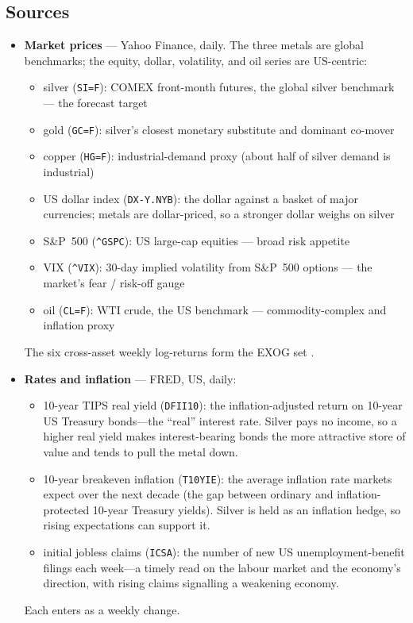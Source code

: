 \documentclass[12pt, a4paper]{article}
\begin{document}
\subsection{Sources}

\begin{itemize}
    \item \textbf{Market prices} --- Yahoo Finance, daily. The three metals are global
    benchmarks; the equity, dollar, volatility, and oil series are US-centric:
    \begin{itemize}[nosep]
        \item silver (\texttt{SI=F}): COMEX front-month futures, the global silver benchmark --- the forecast target
        \item gold (\texttt{GC=F}): silver's closest monetary substitute and dominant co-mover
        \item copper (\texttt{HG=F}): industrial-demand proxy (about half of silver demand is industrial)
        \item US dollar index (\texttt{DX-Y.NYB}): the dollar against a basket of major currencies; metals are dollar-priced, so a stronger dollar weighs on silver
        \item S\&P~500 (\texttt{\textasciicircum GSPC}): US large-cap equities --- broad risk appetite
        \item VIX (\texttt{\textasciicircum VIX}): 30-day implied volatility from S\&P~500 options --- the market's fear / risk-off gauge
        \item oil (\texttt{CL=F}): WTI crude, the US benchmark --- commodity-complex and inflation proxy
    \end{itemize}
    The six cross-asset weekly log-returns form the EXOG set \parencite{batten2010,zhang2010}.

    \item \textbf{Rates and inflation} --- FRED, US, daily:
    \begin{itemize}[nosep]
        \item 10-year TIPS real yield (\texttt{DFII10}): the inflation-adjusted return on
        10-year US Treasury bonds---the ``real'' interest rate. Silver pays no income, so a
        higher real yield makes interest-bearing bonds the more attractive store of value
        and tends to pull the metal down.
        \item 10-year breakeven inflation (\texttt{T10YIE}): the average inflation rate
        markets expect over the next decade (the gap between ordinary and
        inflation-protected 10-year Treasury yields). Silver is held as an inflation hedge,
        so rising expectations can support it.
        \item initial jobless claims (\texttt{ICSA}): the number of new US
        unemployment-benefit filings each week---a timely read on the labour market and the
        economy's direction, with rising claims signalling a weakening economy.
    \end{itemize}
    Each enters as a weekly change.


\end{itemize}
\end{document}
